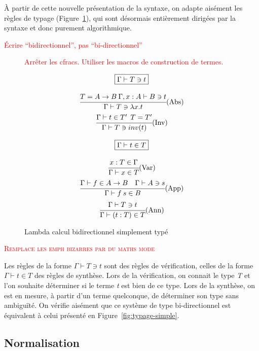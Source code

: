\documentclass {article}
\theoremstyle{definition}
\theoremstyle{remark}
\newcommand{\todo}[1]{\textcolor{red}{#1}}
\begin{document}
À partir de cette nouvelle présentation de la syntaxe, on adapte
aisément les règles de typage
(Figure~\ref{fig:typage-simple-bi-direct}), qui sont désormais
entièrement dirigées par la syntaxe et donc purement algorithmique.

\todo{Écrire ``bidirectionnel'', pas ``bi-directionnel''}

\begin{figure}
\label{regles typage bidirectionnel}

\todo{Arrêter les cfracs. Utiliser les macros de construction de termes.}

\[\begin{array}{c}
\boxed{\Gamma\vdash T \ni t}
\bigskip\\
\cfrac{T = A \rightarrow B \: \Gamma, x:A \vdash B \ni t}
      {\Gamma \vdash T \ni \lambda x. t}\mbox{(Abs)}
\medskip\\
\cfrac{\Gamma \vdash t \in T' \:\: T=T'}
      {\Gamma\vdash T \ni inv(t)}\mbox{(Inv)} 
\bigskip\\
\boxed{\Gamma\vdash t \in T}
\bigskip\\
\cfrac{x:T \in \Gamma}
      {\Gamma \vdash x \in T }\mbox{(Var)}
\medskip\\
\cfrac{\Gamma \vdash f \in A\rightarrow B \quad \Gamma\vdash A \ni s }
      {\Gamma\vdash f\:s\in B}\mbox{(App)} 
\medskip\\
\cfrac{\Gamma\vdash T \ni t}
      {\Gamma\vdash (t:T) \in T}\mbox{(Ann)} 
\end{array}\]


\caption{Lambda calcul  bidirectionnel simplement typé}
\label{fig:typage-simple-bi-direct} 
\end{figure}   

\todo{\textsc{Remplace les emph bizarres par du maths mode}}

Les règles de la forme \(\Gamma\vdash T \ni t\) sont des règles de
vérification, celles de la forme \(\Gamma\vdash t \in T\) des règles
de synthèse.  Lors de la vérification, on connait le type \emph{T} et
l'on souhaite déterminer si le terme \emph{t} est bien de ce
type. Lors de la synthèse, on est en mesure, à partir d'un terme
 quelconque, de déterminer son type sans ambiguïté.  On vérifie
aisément que ce système de type bi-directionnel est équivalent à celui
présenté en Figure~\ref{fig:typage-simple}.

\subsection{Normalisation} %
\end{document}
